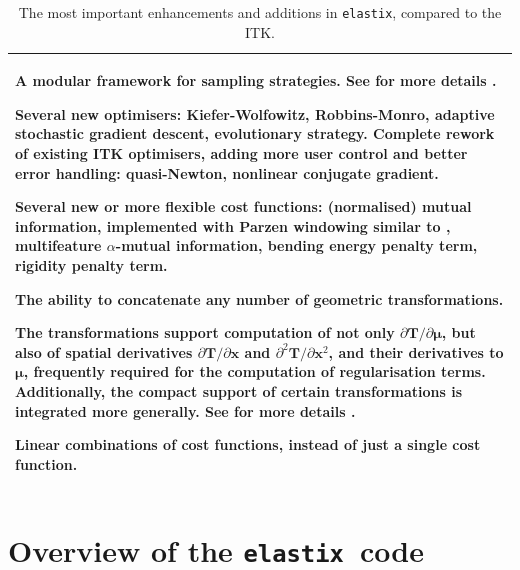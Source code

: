 \documentclass[]{report}
\newcommand{\elastix}{\texttt{elastix}}
\newcommand{\vx}{\bm{x}}
\newcommand{\vmu}{\bm{\mu}}
\newcommand{\vT}{\bm{T}}
\begin{document}
\begin{table}[!h]
\centering
\begin{tabular}{p{30pc}}
\toprule \toprule
\begin{list}{}{\leftmargin=1em}
\item A modular framework for sampling strategies. See for more details \cite{StaringKlein2010b}.

\item Several new optimisers: Kiefer-Wolfowitz, Robbins-Monro, adaptive
    stochastic gradient descent, evolutionary strategy. Complete rework of existing ITK optimisers, adding more user control and
    better error handling: quasi-Newton, nonlinear conjugate gradient.

\item Several new or more flexible cost functions: (normalised) mutual
    information, implemented with Parzen windowing similar to
    \cite{ThevenazEA00a}, multifeature $\alpha$-mutual information, bending
    energy penalty term, rigidity penalty term.

\item The ability to concatenate any number of geometric transformations.

\item The transformations support computation of not only $\partial \vT /
    \partial \vmu$, but also of spatial derivatives $\partial \vT / \partial
    \vx$ and $\partial^2 \vT / \partial \vx^2$, and their derivatives to
    $\vmu$, frequently required for the computation of regularisation terms.
    Additionally, the compact support of certain transformations is integrated
    more generally. See for more details \cite{StaringKlein2010a}.

\item Linear combinations of cost functions, instead of just a single cost
    function.

\end{list}\\
 \bottomrule \bottomrule
\end{tabular}
\caption{The most important enhancements and additions in \elastix, compared to
the ITK.}\label{table:extras}
\end{table}


%
\section{Overview of the \elastix\ code}
\end{document}
